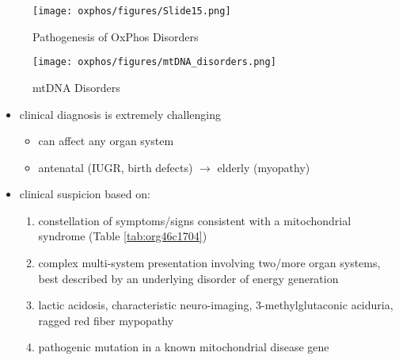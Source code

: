 \documentclass[12pt]{scrartcl}
\begin{document}
\begin{figure}[htbp]
\centering
\texttt{[image: oxphos/figures/Slide15.png]}
\caption[ETC]{\label{fig:org417d9b4}Pathogenesis of OxPhos Disorders}
\end{figure}


\begin{figure}[htbp]
\centering
\texttt{[image: oxphos/figures/mtDNA\_disorders.png]}
\caption{\label{fig:org56c5c73}mtDNA Disorders}
\end{figure}

\begin{itemize}
\item clinical diagnosis is extremely challenging
\begin{itemize}
\item can affect any organ system
\item antenatal (IUGR, birth defects) \(\to\) elderly (myopathy)
\end{itemize}

\item clinical suspicion based on:
\begin{enumerate}
\item constellation of symptoms/signs consistent with a mitochondrial syndrome (Table \ref{tab:org46c1704})
\item complex multi-system presentation involving two/more organ systems,
best described by an underlying disorder of energy generation
\item lactic acidosis, characteristic neuro-imaging, 3-methylglutaconic
aciduria, ragged red fiber mypopathy
\item pathogenic mutation in a known mitochondrial disease gene
\end{enumerate}
\end{itemize}
\end{document}
